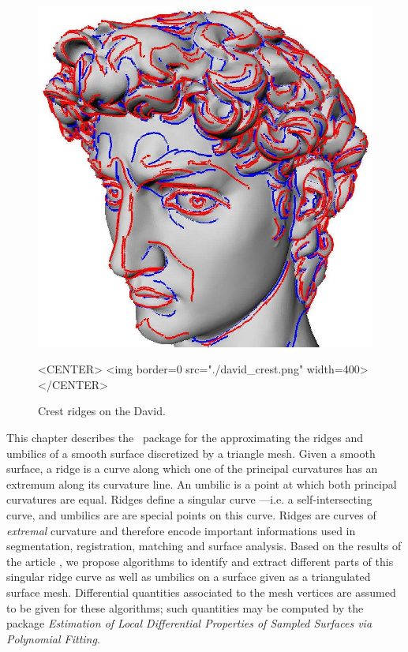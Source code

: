 
\newtheorem{definition}{Definition.}
\newcommand{\hot}{h.o.t}%


\begin{figure}[!ht]
\begin{ccTexOnly}
\centerline{
\includegraphics[width=.5\linewidth]{Ridges_3/david_crest}}
\end{ccTexOnly}

\label{david-crest}
\begin{ccHtmlOnly}
<CENTER> <img border=0 src="./david_crest.png" width=400>
</CENTER>
\end{ccHtmlOnly}
\caption{Crest ridges on the David.}
\end{figure}

This chapter describes the \cgal\ package for the approximating the
ridges and umbilics of a smooth surface discretized by a triangle
mesh.  Given a smooth surface, a ridge is a curve along which one of
the principal curvatures has an extremum along its curvature line. An
umbilic is a point at which both principal curvatures are
equal. Ridges define a singular curve ---i.e. a self-intersecting
curve, and umbilics are are special points on this curve. Ridges are
curves of {\em extremal} curvature and therefore encode important
informations used in segmentation, registration, matching and surface
analysis.  Based on the results of the article
\cite{cgal:cp-tdare-05}, we propose algorithms to identify and extract
different parts of this singular ridge curve as well as umbilics on a
surface given as a triangulated surface mesh. Differential quantities
associated to the mesh vertices are assumed to be given for these
algorithms; such quantities may be computed by the package {\em
Estimation of Local Differential Properties of Sampled Surfaces via
Polynomial Fitting}.

